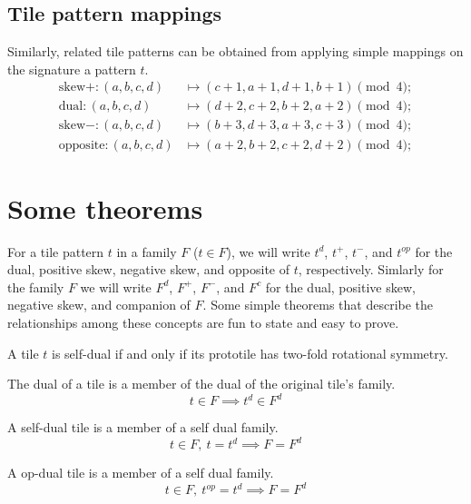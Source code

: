 \documentclass{tufte-book}
\begin{document}
\subsection{Tile pattern mappings}
Similarly, related tile patterns can be obtained from applying simple mappings on the signature a pattern $t$.
\marginnote{\centering}
\begin{align*}        
    \text{skew}+ : (a,b,c,d) &\mapsto (c+1, a+1, d+ 1, b+1) \pmod{4};\\
    \text{dual} : (a,b,c,d) &\mapsto (d+2, c+2, b+ 2, a+2) \pmod{4};\\
    \text{skew}- : (a,b,c,d) &\mapsto (b+3, d+3, a+ 3, c+3) \pmod{4};\\
    \text{opposite} : (a,b,c,d) &\mapsto (a+2, b+2, c+2, d+2) \pmod{4};
\end{align*}

\section{Some theorems}

\noindent
For a tile pattern $t$ in a family $F$ ($t\in F$), we will write $t^d$, $t^+$, $t^-$, and  $t^{op}$ for the dual, positive skew, negative skew, and opposite of $t$, respectively. Simlarly for the family $F$ we will write $F^d$, $F^+$, $F^-$, and  $F^{c}$ for the dual, positive skew, negative skew, and companion of $F$. Some simple theorems that describe the relationships among these concepts are fun to state and easy to prove.

\begin{theorem}
A tile $t$ is self-dual if and only if its prototile has two-fold rotational symmetry.      
\end{theorem}

\begin{theorem}
The dual of a tile is a member of the dual of the original tile's family.
$$t\in F \implies t^d \in F^d$$  
\end{theorem}

\begin{theorem}
A self-dual tile is a member of a self dual family. 
$$t\in F, \: t=t^d \implies F = F^d$$     
\end{theorem}

\begin{theorem}
A op-dual tile is a member of a self dual family.  
$$t\in F, \: t^{op}=t^d \implies F = F^d$$     
\end{theorem}
\end{document}
